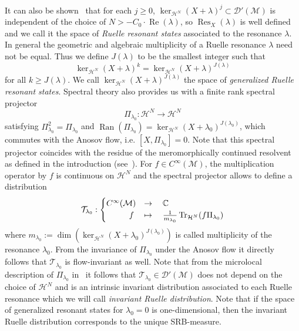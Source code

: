 \documentclass[AHL, Unicode, longabstracts, published]{cedram}
\DeclareMathOperator{\Tr}{Tr}
\DeclareMathOperator{\Res}{Res}
\DeclareMathOperator{\Real}{Re}
\DeclareMathOperator{\Ran}{Ran}
\newcommand{\mc}{\mathcal}
\newcommand{\cc}{\mathbb{C}}
\newcommand{\la}{\lambda}
\let\Re=\Real
\renewcommand{\Re}{\operatorname{Re}}
\begin{document}
It can also be shown~\cite[Theorem~1.5]{FSj11} that for each $j\geq 0$, $\ker_{\mc{H}^N}(X+\lambda)^j\subset \mathcal D'(\mathcal M)$ is independent of the choice of $N> -C_0\cdot \Re(\lambda)$, so $\Res_{X}(\lambda)$ is well defined and we call it the space of \emph{Ruelle resonant states} associated to the resonance $\lambda$. In general the geometric and algebraic multiplicity of a Ruelle resonance $\lambda$ need not be equal. Thus we define $J(\lambda)$ to be the smallest integer such that
\[
\ker_{\mc{H}^N}(X+\lambda)^k = \ker_{\mc{H}^N}(X+\lambda)^{J(\lambda)}
\]
for all $k\geq J(\lambda)$. We call $\ker_{\mc{H}^N}(X+\lambda)^{J(\lambda)}$ the space of \emph{generalized Ruelle resonant states}. Spectral theory also provides us with a finite rank spectral projector
\[
\Pi_{\lambda_0} : \mc{H}^N \to \mc{H}^N
\]
satisfying $\Pi_{\lambda_0}^2= \Pi_{\lambda_0}$ and $\Ran(\Pi_{\lambda_0})=\ker_{\mc{H}^N}(X+\lambda_0)^{J(\lambda_0)}$, which commutes with the Anosov flow, i.e. $[X,\Pi_{\lambda_0}] = 0$. Note that this spectral projector coincides with the residue of the meromorphically continued resolvent as defined in the introduction (see~\cite[Section~4]{DZ16}). For $f\in C^\infty(\mathcal M)$, the multiplication operator by $f$ is continuous on $\mc{H}^N$ and the spectral projector allows to define a distribution
\begin{equation}\label{eq:inv_ruelle_dist}
\mathcal T_{\lambda_0}:
\begin{cases}
C^\infty (\mc{M})& \rightarrow\quad\cc\\
\mkern 50mu f & \mapsto\quad\frac{1}{m_{\lambda_0}}\Tr_{\mc{H}^N}(f\Pi_{\lambda_0})
\end{cases}
\end{equation}
where $m_{\lambda_0} := \dim(\ker_{\mc{H}^N}(X+\lambda_0)^{J(\lambda_0)})$ is called multiplicity of the resonance $\la_0$. From the invariance of $\Pi_{\lambda_0}$ under the Anosov flow it directly follows that $\mathcal T_{\lambda_0}$ is flow-invariant as well. Note that from the microlocal description of $\Pi_{\lambda_0}$ in~\cite{DZ16} it follows that $\mathcal T_{\lambda_0} \in \mc{D}'(\mathcal M)$ does not depend on the choice of $\mc{H}^N$ and is an intrinsic invariant distribution associated to each Ruelle resonance which we will call \emph{invariant Ruelle distribution}. Note that if the space of generalized resonant states for $\lambda_0=0$ is one-dimensional, then the invariant Ruelle distribution corresponds to the unique SRB-measure.
\end{document}
